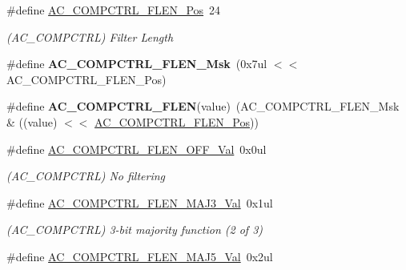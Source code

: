 \begin{DoxyCompactItemize}
\item 
\hypertarget{group___s_a_m_l21___a_c_ga66181eff5fbbb90049f3aae3b27b5a62}{}\#define \hyperlink{group___s_a_m_l21___a_c_ga66181eff5fbbb90049f3aae3b27b5a62}{A\+C\+\_\+\+C\+O\+M\+P\+C\+T\+R\+L\+\_\+\+F\+L\+E\+N\+\_\+\+Pos}~24\label{group___s_a_m_l21___a_c_ga66181eff5fbbb90049f3aae3b27b5a62}

\begin{DoxyCompactList}\small\item\em (A\+C\+\_\+\+C\+O\+M\+P\+C\+T\+R\+L) Filter Length \end{DoxyCompactList}\item 
\hypertarget{group___s_a_m_l21___a_c_gac6722289f24273d120a620b6f8d2dca0}{}\#define {\bfseries A\+C\+\_\+\+C\+O\+M\+P\+C\+T\+R\+L\+\_\+\+F\+L\+E\+N\+\_\+\+Msk}~(0x7ul $<$$<$ A\+C\+\_\+\+C\+O\+M\+P\+C\+T\+R\+L\+\_\+\+F\+L\+E\+N\+\_\+\+Pos)\label{group___s_a_m_l21___a_c_gac6722289f24273d120a620b6f8d2dca0}

\item 
\hypertarget{group___s_a_m_l21___a_c_ga9af296187c31a82f625033dd6799f6d7}{}\#define {\bfseries A\+C\+\_\+\+C\+O\+M\+P\+C\+T\+R\+L\+\_\+\+F\+L\+E\+N}(value)~(A\+C\+\_\+\+C\+O\+M\+P\+C\+T\+R\+L\+\_\+\+F\+L\+E\+N\+\_\+\+Msk \& ((value) $<$$<$ \hyperlink{group___s_a_m_l21___a_c_ga66181eff5fbbb90049f3aae3b27b5a62}{A\+C\+\_\+\+C\+O\+M\+P\+C\+T\+R\+L\+\_\+\+F\+L\+E\+N\+\_\+\+Pos}))\label{group___s_a_m_l21___a_c_ga9af296187c31a82f625033dd6799f6d7}

\item 
\hypertarget{group___s_a_m_l21___a_c_ga724ff78f629c59a482f3318c76dca04e}{}\#define \hyperlink{group___s_a_m_l21___a_c_ga724ff78f629c59a482f3318c76dca04e}{A\+C\+\_\+\+C\+O\+M\+P\+C\+T\+R\+L\+\_\+\+F\+L\+E\+N\+\_\+\+O\+F\+F\+\_\+\+Val}~0x0ul\label{group___s_a_m_l21___a_c_ga724ff78f629c59a482f3318c76dca04e}

\begin{DoxyCompactList}\small\item\em (A\+C\+\_\+\+C\+O\+M\+P\+C\+T\+R\+L) No filtering \end{DoxyCompactList}\item 
\hypertarget{group___s_a_m_l21___a_c_ga7e847b79ecfd83187149193ecaead562}{}\#define \hyperlink{group___s_a_m_l21___a_c_ga7e847b79ecfd83187149193ecaead562}{A\+C\+\_\+\+C\+O\+M\+P\+C\+T\+R\+L\+\_\+\+F\+L\+E\+N\+\_\+\+M\+A\+J3\+\_\+\+Val}~0x1ul\label{group___s_a_m_l21___a_c_ga7e847b79ecfd83187149193ecaead562}

\begin{DoxyCompactList}\small\item\em (A\+C\+\_\+\+C\+O\+M\+P\+C\+T\+R\+L) 3-\/bit majority function (2 of 3) \end{DoxyCompactList}\item 
\hypertarget{group___s_a_m_l21___a_c_gaaf4628cdfeb3c447df3cab7adf2665a8}{}\#define \hyperlink{group___s_a_m_l21___a_c_gaaf4628cdfeb3c447df3cab7adf2665a8}{A\+C\+\_\+\+C\+O\+M\+P\+C\+T\+R\+L\+\_\+\+F\+L\+E\+N\+\_\+\+M\+A\+J5\+\_\+\+Val}~0x2ul\label{group___s_a_m_l21___a_c_gaaf4628cdfeb3c447df3cab7adf2665a8}


\end{DoxyCompactItemize}
